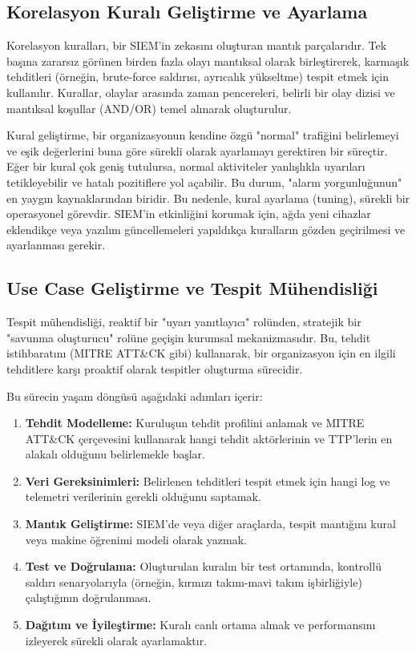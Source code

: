 \subsection{Korelasyon Kuralı Geliştirme ve Ayarlama}

Korelasyon kuralları, bir SIEM'in zekasını oluşturan mantık parçalarıdır. Tek başına zararsız görünen birden fazla olayı mantıksal olarak birleştirerek, karmaşık tehditleri (örneğin, brute-force saldırısı, ayrıcalık yükseltme) tespit etmek için kullanılır. Kurallar, olaylar arasında zaman pencereleri, belirli bir olay dizisi ve mantıksal koşullar (AND/OR) temel alınarak oluşturulur.

Kural geliştirme, bir organizasyonun kendine özgü "normal" trafiğini belirlemeyi ve eşik değerlerini buna göre sürekli olarak ayarlamayı gerektiren bir süreçtir. Eğer bir kural çok geniş tutulursa, normal aktiviteler yanlışlıkla uyarıları tetikleyebilir ve hatalı pozitiflere yol açabilir. Bu durum, "alarm yorgunluğunun" en yaygın kaynaklarından biridir. Bu nedenle, kural ayarlama (tuning), sürekli bir operasyonel görevdir. SIEM'in etkinliğini korumak için, ağda yeni cihazlar eklendikçe veya yazılım güncellemeleri yapıldıkça kuralların gözden geçirilmesi ve ayarlanması gerekir.

\subsection{Use Case Geliştirme ve Tespit Mühendisliği}

Tespit mühendisliği, reaktif bir "uyarı yanıtlayıcı" rolünden, stratejik bir "savunma oluşturucu" rolüne geçişin kurumsal mekanizmasıdır. Bu, tehdit istihbaratını (MITRE ATT\&CK gibi) kullanarak, bir organizasyon için en ilgili tehditlere karşı proaktif olarak tespitler oluşturma sürecidir.

Bu sürecin yaşam döngüsü aşağıdaki adımları içerir:
\begin{enumerate}
    \item \textbf{Tehdit Modelleme:} Kuruluşun tehdit profilini anlamak ve MITRE ATT\&CK çerçevesini kullanarak hangi tehdit aktörlerinin ve TTP'lerin en alakalı olduğunu belirlemekle başlar.
    \item \textbf{Veri Gereksinimleri:} Belirlenen tehditleri tespit etmek için hangi log ve telemetri verilerinin gerekli olduğunu saptamak.
    \item \textbf{Mantık Geliştirme:} SIEM'de veya diğer araçlarda, tespit mantığını kural veya makine öğrenimi modeli olarak yazmak.
    \item \textbf{Test ve Doğrulama:} Oluşturulan kuralın bir test ortamında, kontrollü saldırı senaryolarıyla (örneğin, kırmızı takım-mavi takım işbirliğiyle) çalıştığının doğrulanması.
    \item \textbf{Dağıtım ve İyileştirme:} Kuralı canlı ortama almak ve performansını izleyerek sürekli olarak ayarlamaktır.
\end{enumerate}

